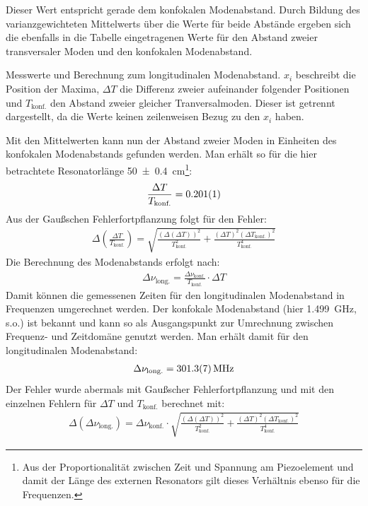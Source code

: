 \documentclass[11pt, a4paper]{article}
\numberwithin{equation}{section}
\begin{document}
Dieser Wert entspricht gerade dem konfokalen Modenabstand.
Durch Bildung des varianzgewichteten Mittelwerts über die Werte für beide Abstände ergeben sich die ebenfalls in die Tabelle eingetragenen Werte für den Abstand zweier transversaler Moden und den konfokalen Modenabstand. 
\begin{table}[h]
\centering
\resizebox{\columnwidth}{!}{%
}
\caption{Messwerte und Berechnung zum longitudinalen Modenabstand. $x_i$ beschreibt die Position der Maxima, $\Delta T$ die Differenz zweier aufeinander folgender Positionen und $T_\text{konf.}$ den Abstand zweier gleicher Tranversalmoden. Dieser ist getrennt dargestellt, da die Werte keinen zeilenweisen Bezug zu den $x_i$ haben.}
\label{tab:ALL0028}
\end{table}
Mit den Mittelwerten kann nun der Abstand zweier Moden in Einheiten des konfokalen Modenabstands gefunden werden.
Man erhält so für die hier betrachtete Resonatorlänge \SI{50+-0.4}{\centi\metre}\footnote{Aus der Proportionalität zwischen Zeit und Spannung am Piezoelement und damit der Länge des externen Resonators gilt dieses Verhältnis ebenso für die Frequenzen.}:
\begin{align}
\frac{\Delta T}{T_\text{konf.}}= \num{0.201+-0.001}
\end{align}
Aus der Gaußschen Fehlerfortpflanzung folgt für den Fehler:
\begin{align}
\Delta\left(\frac{\Delta T}{T_\text{konf.}}\right)=\sqrt{\frac{(\Delta(\Delta T))^2}{T_\text{konf.}^2}+\frac{(\Delta T)^2(\Delta T_\text{konf.})^2}{T_\text{konf.}^4}}
\end{align}
Die Berechnung des Modenabstands erfolgt nach:
\begin{align}
\Delta\nu_\text{long.}=\frac{\Delta\nu_\text{konf.}}{T_\text{konf.}} \cdot \Delta T 
\end{align}
Damit können die gemessenen Zeiten für den longitudinalen Modenabstand in Frequenzen umgerechnet werden.
Der konfokale Modenabstand (hier \SI{1.499}{\giga\hertz}, s.o.) ist bekannt und kann so als Ausgangspunkt zur Umrechnung zwischen Frequenz- und Zeitdomäne genutzt werden.
Man erhält damit für den longitudinalen Modenabstand:
\begin{align}
\Delta\nu_\text{long.}=\SI{301.3+-0.7}{\mega\hertz}
\end{align}
Der Fehler wurde abermals mit Gaußscher Fehlerfortpflanzung und mit den einzelnen Fehlern für $\Delta T$ und $T_\text{konf.}$ berechnet mit:
\begin{align}
\Delta\left(\Delta\nu_\text{long.}\right)=\Delta\nu_\text{konf.}\cdot\sqrt{\frac{(\Delta(\Delta T))^2}{T_\text{konf.}^2}+\frac{(\Delta T)^2(\Delta T_\text{konf.})^2}{T_\text{konf.}^4}}
\end{align}
\end{document}
